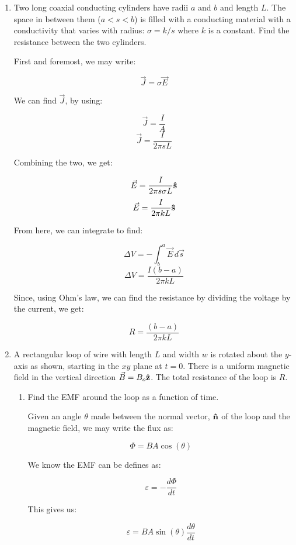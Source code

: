 \begin{enumerate}

  \item Two long coaxial conducting cylinders have radii $a$ and $b$ and length $L$. The space in between them ($a<s<b$) is filled with a conducting material with a conductivity that varies with radius: $\sigma=k/s$ where $k$ is a constant. Find the resistance between the two cylinders.

    First and foremost, we may write:

    $$\vec{J}=\sigma\vec{E}$$

    We can find $\vec{J}$, by using:

    $$\vec{J}=\frac{I}{A}$$
    $$\vec{J}=\frac{I}{2\pi sL}$$

    Combining the two, we get:

    $$\vec{E}=\frac{I}{2\pi s\sigma L}\bold{\hat{s}}$$
    $$\vec{E}=\frac{I}{2\pi k L}\bold{\hat{s}}$$

    From here, we can integrate to find:

    $$\Delta V=-\int_b^a \vec{E}\,d\vec{s}$$
    $$\Delta V=\frac{I(b-a)}{2\pi k L}$$

    Since, using Ohm's law, we can find the resistance by dividing the voltage by the current, we get:

    $$\boxed{R=\frac{(b-a)}{2\pi kL}}$$

  \item A rectangular loop of wire with length $L$ and width $w$ is rotated about the $y$-axis as shown, starting in the $xy$ plane at $t = 0$. There is a uniform magnetic field in the vertical direction $\vec{B}=B_o\bold{\hat{z}}$. The total resistance of the loop is $R$.

    \begin{enumerate}

      \item Find the EMF around the loop as a function of time.

        Given an angle $\theta$ made between the normal vector, $\bold{\hat{n}}$ of the loop and the magnetic field, we may write the flux as:

        $$\Phi=BA\cos(\theta)$$

        We know the EMF can be defines as:

        $$\varepsilon=-\frac{d\Phi}{dt}$$

        This gives us:

        $$\varepsilon=BA\sin(\theta)\frac{d\theta}{dt}$$


\end{enumerate}
\end{enumerate}
